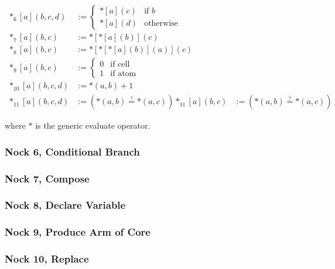 \begin{align}
*_{6}[a](b,c,d) &:= \left\{ \begin{matrix} *[a](c) & \textrm{if } b \\ *[a](d) & \textrm{otherwise} \end{matrix} \right. \\
*_{7}[a](b,c) &:= *[*[a](b)](c) \\
*_{8}[a](b,c) &:= *[*[*[a](b)](a)](c) \\  %
*_{9}[a](b,c) &:= \left\{\begin{matrix} 0 & \text{if cell} \\ 1 & \text{if atom} \end{matrix} \right. \\
*_{10}[a](b,c,d) &:= {*(a,b) + 1} \\
*_{11}[a](b,c,d) &:= ({*(a,b)} \stackrel{?}{=} {*(a,c)})
*_{11}[a](b,c) &:= ({*(a,b)} \stackrel{?}{=} {*(a,c)})
\end{align}

where $*$ is the generic evaluate operator.

\subsubsection[Nock 6]{Nock 6, Conditional Branch}
\subsubsection[Nock 7]{Nock 7, Compose}
\subsubsection[Nock 8]{Nock 8, Declare Variable}
\subsubsection[Nock 9]{Nock 9, Produce Arm of Core}
\subsubsection[Nock 10]{Nock 10, Replace}
